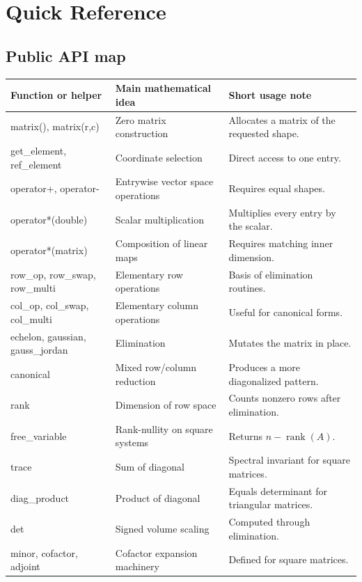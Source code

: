 \documentclass[11pt,a4paper,openany]{book}
\def\code#1{#1}%
\DeclareRobustCommand{\code}[1]{\texttt{\detokenize{#1}}}
\DeclareMathOperator{\rankop}{rank}
\begin{document}
\appendix

\chapter{Quick Reference}

\section{Public API map}
\begin{longtable}{@{}p{}p{}p{}@{}}
\toprule
Function or helper & Main mathematical idea & Short usage note \\
\midrule
\endhead
\code{matrix()}, \code{matrix(r,c)} & Zero matrix construction & Allocates a matrix of the requested shape. \\
\code{get_element}, \code{ref_element} & Coordinate selection & Direct access to one entry. \\
\code{operator+}, \code{operator-} & Entrywise vector space operations & Requires equal shapes. \\
\code{operator*(double)} & Scalar multiplication & Multiplies every entry by the scalar. \\
\code{operator*(matrix)} & Composition of linear maps & Requires matching inner dimension. \\
\code{row_op}, \code{row_swap}, \code{row_multi} & Elementary row operations & Basis of elimination routines. \\
\code{col_op}, \code{col_swap}, \code{col_multi} & Elementary column operations & Useful for canonical forms. \\
\code{echelon}, \code{gaussian}, \code{gauss_jordan} & Elimination & Mutates the matrix in place. \\
\code{canonical} & Mixed row/column reduction & Produces a more diagonalized pattern. \\
\code{rank} & Dimension of row space & Counts nonzero rows after elimination. \\
\code{free_variable} & Rank-nullity on square systems & Returns \(n-\rankop(A)\). \\
\code{trace} & Sum of diagonal & Spectral invariant for square matrices. \\
\code{diag_product} & Product of diagonal & Equals determinant for triangular matrices. \\
\code{det} & Signed volume scaling & Computed through elimination. \\
\code{minor}, \code{cofactor}, \code{adjoint} & Cofactor expansion machinery & Defined for square matrices. \\

\end{longtable}
\end{document}
